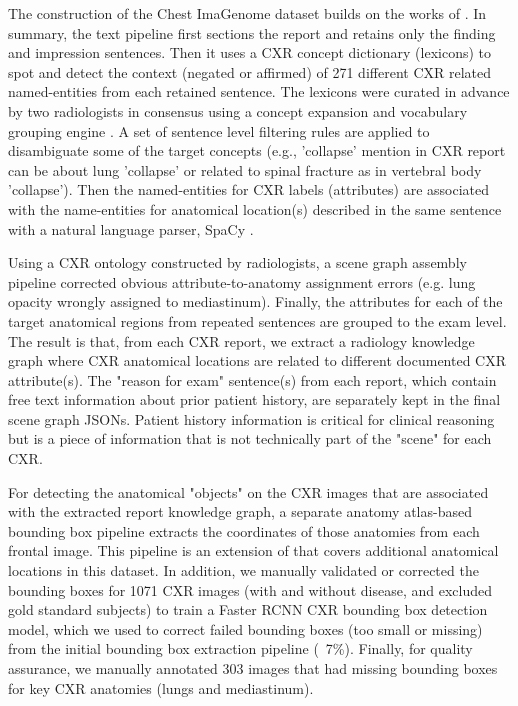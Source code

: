 \vspace{-10pt}
The construction of the Chest ImaGenome dataset builds on the works of \cite{wu2020ai,wu2020automatic}. In summary, the text pipeline \cite{wu2020ai} first sections the report and retains only the finding and impression sentences. Then it uses a CXR concept dictionary (lexicons) to spot and detect the context (negated or affirmed) of 271 different CXR related named-entities from each retained sentence. The lexicons were curated in advance by two radiologists in consensus using a concept expansion and vocabulary grouping engine \cite{coden2012spot}. A set of sentence level filtering rules are applied to disambiguate some of the target concepts (e.g., 'collapse' mention in CXR report can be about lung 'collapse' or related to spinal fracture as in vertebral body 'collapse'). Then the named-entities for CXR labels (attributes) are associated with the name-entities for anatomical location(s) described in the same sentence with a natural language parser, SpaCy \cite{spacy}. 

Using a CXR ontology constructed by radiologists, a scene graph assembly pipeline corrected obvious attribute-to-anatomy assignment errors (e.g. lung opacity wrongly assigned to mediastinum). Finally, the attributes for each of the target anatomical regions from repeated sentences are grouped to the exam level. The result is that, from each CXR report, we extract a radiology knowledge graph where CXR anatomical locations are related to different documented CXR attribute(s). The "reason for exam" sentence(s) from each report, which contain free text information about prior patient history, are separately kept in the final scene graph JSONs. Patient history information is critical for clinical reasoning but is a piece of information that is not technically part of the "scene" for each CXR. 

For detecting the anatomical "objects" on the CXR images that are associated with the extracted report knowledge graph, a separate anatomy atlas-based bounding box pipeline extracts the coordinates of those anatomies from each frontal image. This pipeline is an extension of \cite{wu2020automatic} that covers additional anatomical locations in this dataset. In addition, we manually validated or corrected the bounding boxes for 1071 CXR images (with and without disease, and excluded gold standard subjects) to train a Faster RCNN CXR bounding box detection model, which we used to correct failed bounding boxes (too small or missing) from the initial bounding box extraction pipeline (~7\%). Finally, for quality assurance, we manually annotated 303 images that had missing bounding boxes for key CXR anatomies (lungs and mediastinum).

